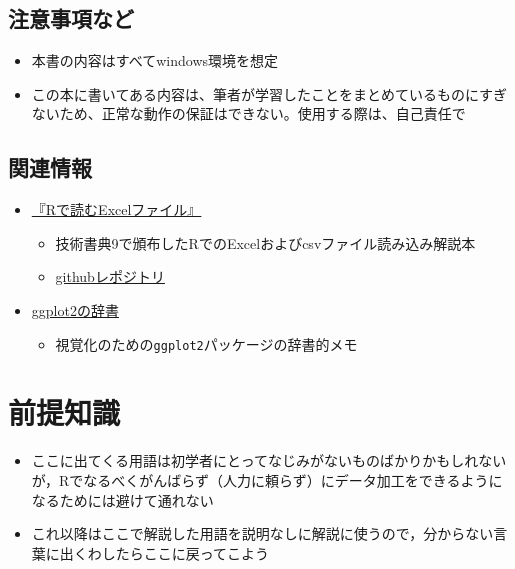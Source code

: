 \documentclass[
  xelatex,ja=standard, b5paper]{bxjsbook}
\providecommand{\tightlist}{%
  \setlength{\itemsep}{0pt}\setlength{\parskip}{0pt}}
\begin{document}
\hypertarget{ux6ce8ux610fux4e8bux9805ux306aux3069}{%
\section*{注意事項など}\label{ux6ce8ux610fux4e8bux9805ux306aux3069}}

\begin{itemize}
\tightlist
\item
  本書の内容はすべてwindows環境を想定
\item
  この本に書いてある内容は、筆者が学習したことをまとめているものにすぎないため、正常な動作の保証はできない。使用する際は、自己責任で
\end{itemize}

\hypertarget{association}{%
\section*{関連情報}\label{association}}

\begin{itemize}
\tightlist
\item
  \href{https://techbookfest.org/product/4794168259903488?productVariantID=5913872206659584}{『Rで読むExcelファイル』}

  \begin{itemize}
  \tightlist
  \item
    技術書典9で頒布したRでのExcelおよびcsvファイル読み込み解説本
  \item
    \href{https://izunyan.github.io/excel_r/}{githubレポジトリ}
  \end{itemize}
\item
  \href{https://izunyan.github.io/practice_ggplot2/}{ggplot2の辞書}

  \begin{itemize}
  \tightlist
  \item
    視覚化のための\texttt{ggplot2}パッケージの辞書的メモ
  \end{itemize}
\end{itemize}

\hypertarget{premise}{%
\chapter{前提知識}\label{premise}}

\begin{itemize}
\tightlist
\item
  ここに出てくる用語は初学者にとってなじみがないものばかりかもしれないが，Rでなるべくがんばらず（人力に頼らず）にデータ加工をできるようになるためには避けて通れない
\item
  これ以降はここで解説した用語を説明なしに解説に使うので，分からない言葉に出くわしたらここに戻ってこよう
\end{itemize}
\end{document}
